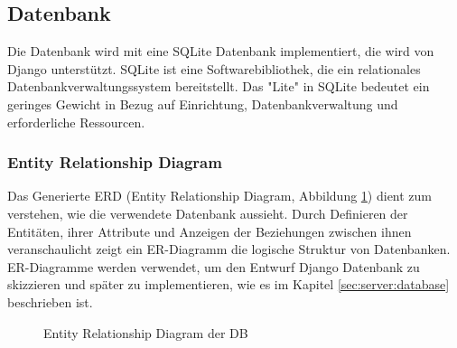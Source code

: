 \subsection{Datenbank}
\label{sec:design:db}
Die Datenbank wird mit eine SQLite Datenbank implementiert, die wird von Django unterstützt. SQLite ist eine Softwarebibliothek, die ein relationales Datenbankverwaltungssystem bereitstellt. Das "Lite" in SQLite bedeutet ein geringes Gewicht in Bezug auf Einrichtung, Datenbankverwaltung und erforderliche Ressourcen. 
\subsubsection{Entity Relationship Diagram}
\label{sec:design:db:erd}
Das Generierte ERD (Entity Relationship Diagram, Abbildung \ref{fig:erd}) dient zum verstehen, wie die verwendete Datenbank aussieht. Durch Definieren der Entitäten, ihrer Attribute und Anzeigen der Beziehungen zwischen ihnen veranschaulicht zeigt ein ER-Diagramm die logische Struktur von Datenbanken. ER-Diagramme werden verwendet, um den Entwurf Django Datenbank zu skizzieren und später zu implementieren, wie es im Kapitel \ref{sec:server:database} beschrieben ist. 
\begin{figure}
	\centering
	\caption{Entity Relationship Diagram der DB}
	\label{fig:erd}
\end{figure}


